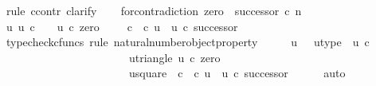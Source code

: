 \begin{isabellebody}
%
\isatagproof
{}\isamarkupfalse%
\ {\isacharparenleft}{\kern0pt}rule\ ccontr{\isacharcomma}{\kern0pt}\ clarify{\isacharparenright}{\kern0pt}\isanewline
\ \ \isamarkupfalse%
\ for{\isacharunderscore}{\kern0pt}contradiction{\isacharcolon}{\kern0pt}\ {\isachardoublequoteopen}zero\ {\isacharequal}{\kern0pt}\ successor\ {\isasymcirc}\isactrlsub c\ n{\isachardoublequoteclose}\isanewline
\ \ \isamarkupfalse%
\ {\isachardoublequoteopen}{\isasymexists}{\isacharbang}{\kern0pt}u{\isachardot}{\kern0pt}\ u{\isacharcolon}{\kern0pt}\ {\isasymnat}\isactrlsub c\ {\isasymrightarrow}\ {\isasymOmega}\ {\isasymand}\ u\ {\isasymcirc}\isactrlsub c\ zero\ {\isacharequal}{\kern0pt}\ {\isasymt}\ {\isasymand}\ {\isacharparenleft}{\kern0pt}{\isasymf}\ {\isasymcirc}\isactrlsub c\ {\isasymbeta}\isactrlbsub {\isasymOmega}\isactrlesub {\isacharparenright}{\kern0pt}\ {\isasymcirc}\isactrlsub c\ u\ {\isacharequal}{\kern0pt}\ u\ {\isasymcirc}\isactrlsub c\ successor{\isachardoublequoteclose}\isanewline
\ \ \ \ \isamarkupfalse%
\ {\isacharparenleft}{\kern0pt}typecheck{\isacharunderscore}{\kern0pt}cfuncs{\isacharcomma}{\kern0pt}\ rule\ natural{\isacharunderscore}{\kern0pt}number{\isacharunderscore}{\kern0pt}object{\isacharunderscore}{\kern0pt}property{}{\isacharparenright}{\kern0pt}\isanewline
\ \ \isamarkupfalse%
\ \isamarkupfalse%
\ u\ \ \ u{\isacharunderscore}{\kern0pt}type{\isacharcolon}{\kern0pt}\ \ {\isachardoublequoteopen}u{\isacharcolon}{\kern0pt}\ {\isasymnat}\isactrlsub c\ {\isasymrightarrow}\ {\isasymOmega}{\isachardoublequoteclose}\ \ \isanewline
\ \ \ \ \ \ \ \ \ \ \ \ \ \ \ \ \ \ \ \ \ \ \ u{\isacharunderscore}{\kern0pt}triangle{\isacharcolon}{\kern0pt}\ {\isachardoublequoteopen}u\ {\isasymcirc}\isactrlsub c\ zero\ {\isacharequal}{\kern0pt}\ {\isasymt}{\isachardoublequoteclose}\ \ \ \isanewline
\ \ \ \ \ \ \ \ \ \ \ \ \ \ \ \ \ \ \ \ \ \ \ u{\isacharunderscore}{\kern0pt}square{\isacharcolon}{\kern0pt}\ {\isachardoublequoteopen}{\isacharparenleft}{\kern0pt}{\isasymf}\ {\isasymcirc}\isactrlsub c\ {\isasymbeta}\isactrlbsub {\isasymOmega}\isactrlesub {\isacharparenright}{\kern0pt}\ {\isasymcirc}\isactrlsub c\ u\ {\isacharequal}{\kern0pt}\ u\ {\isasymcirc}\isactrlsub c\ successor{\isachardoublequoteclose}\isanewline
\ \ \ \ \isamarkupfalse%
\ auto\isanewline
\ \ \isamarkupfalse%
\ {\isachardoublequoteopen}{\isasymt}\ {\isacharequal}{\kern0pt}\ {\isasymf}{\isachardoublequoteclose}\ \isanewline

\end{isabellebody}
